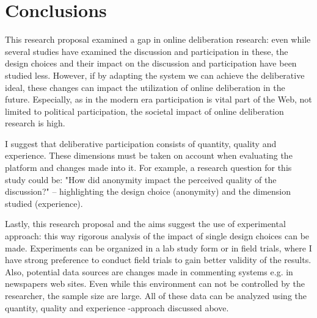 \documentclass{article}
\begin{document}
\section{Conclusions}

This research proposal examined a gap in online deliberation research: even while several studies have examined the discussion and participation in these, the design choices and their impact on the discussion and participation have been studied less. However, if by adapting the system we can achieve the deliberative ideal, these changes can impact the utilization of online deliberation in the future. Especially, as in the modern era participation is vital part of the Web, not limited to political participation, the societal impact of online deliberation research is high.

I suggest that deliberative participation consists of quantity, quality and experience. These dimensions must be taken on account when evaluating the platform and changes made into it. For example, a research question for this study could be: "How did anonymity impact the perceived quality of the discussion?" -- highlighting the design choice (anonymity) and the dimension studied (experience).

Lastly, this research proposal and the aims suggest the use of experimental approach: this way rigorous analysis of the impact of single design choices can be made. Experiments can be organized in a lab study form or in field trials, where I have strong preference to conduct field trials to gain better validity of the results. Also, potential data sources are changes made in commenting systems e.g. in newspapers web sites. Even while this environment can not be controlled by the researcher, the sample size are large. All of these data can be analyzed using the quantity, quality and experience -approach discussed above.

\newpage


\begin{small}

\end{small}
\end{document}
